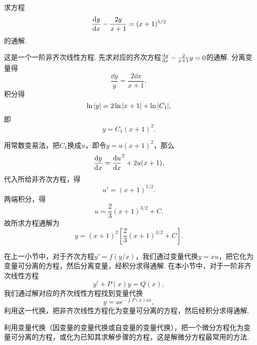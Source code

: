\begin{example}
求方程\begin{equation*}
	\dv{y}{x} - \frac{2y}{x+1} = (x+1)^{5/2}
\end{equation*}的通解.
\begin{solution}
这是一个一阶非齐次线性方程.
先求对应的齐次方程\(\dv{y}{x} - \frac{2}{x+1} y = 0\)的通解.
分离变量得\begin{equation*}
	\frac{\dd{y}}{y} = \frac{2 \dd{x}}{x+1},
\end{equation*}
积分得\begin{equation*}
	\ln\abs{y} = 2\ln\abs{x+1}+ \ln\abs{C_1},
\end{equation*}
即\begin{equation*}
	y = C_1 (x+1)^2.
\end{equation*}

用常数变易法，把\(C_1\)换成\(u\)，即令\(y = u(x+1)^2\)，那么\begin{equation*}
	\dv{y}{x} = \dv{u}{x} (x+1)^2 + 2u(x+1),
\end{equation*}
代入所给非齐次方程，得\begin{equation*}
	u' = (x+1)^{1/2}.
\end{equation*}
两端积分，得\begin{equation*}
	u = \frac{2}{3} (x+1)^{3/2} + C.
\end{equation*}
故所求方程通解为\begin{equation*}
	y = (x+1)^2 \left[
	\frac{2}{3} (x+1)^{3/2} + C
	\right].
\end{equation*}
\end{solution}
\end{example}

在上一小节中，对于齐次方程\(y' = f(y/x)\)，我们通过变量代换\(y = xu\)，把它化为变量可分离的方程，然后分离变量，经积分求得通解.
在本小节中，对于一阶非齐次线性方程\begin{equation*}
y' + P(x) y = Q(x),
\end{equation*}我们通过解对应的齐次线性方程找到变量代换\begin{equation*}
y = u e^{- \int P(x) \dd{x}},
\end{equation*}利用这一代换，把非齐次线性方程化为变量可分离的方程，然后经积分求得通解.

利用变量代换（因变量的变量代换或自变量的变量代换），把一个微分方程化为变量可分离的方程，或化为已知其求解步骤的方程，这是解微分方程最常用的方法.


